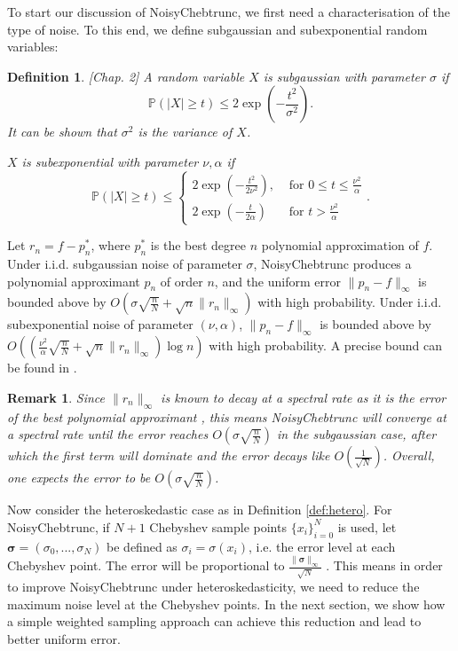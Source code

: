 \documentclass[pdflatex,sn-mathphys-num]{sn-jnl}%
\theoremstyle{thmstyleone}%
\theoremstyle{thmstyletwo}%
\newtheorem{remark}{Remark}%
\newtheorem{definition}{Definition}%
\theoremstyle{thmstylethree}%
\begin{document}
To start our discussion of NoisyChebtrunc, we first need a characterisation of the type of noise. To this end, we define subgaussian and subexponential random variables:

\begin{definition} \cite{Wainwright_2019}[Chap. 2]
	A random variable $X$ is subgaussian with parameter $\sigma$ if 
	\[\mathbb{P}( |X|\geq t) \leq 2\exp(-\frac{t^2}{\sigma^2}).\]
	It can be shown that $\sigma^2$ is the variance of $X$.
	
	
	$X$ is subexponential with parameter $\nu, \alpha$ if
	\begin{equation*}
		\mathbb{P}( |X|\geq t) \leq 
		\begin{cases}
			2\exp(-\frac{t^2}{2\nu^2}), &\text{ for } 0\leq t \leq \frac{\nu^2}{\alpha}\\
			2\exp(-\frac{t}{2\alpha}) &\text{ for } t>\frac{\nu^2}{\alpha}
			
		\end{cases}.
	\end{equation*} 
\end{definition}

Let $r_n = f-p_n^*$, where $p_n^*$ is the best degree $n$ polynomial approximation of $f$. Under i.i.d. subgaussian noise of parameter $\sigma$, NoisyChebtrunc produces a polynomial approximant $p_n$ of order $ n $, and the uniform error $\|p_n-f\|_\infty$ is bounded above by $O(\sigma\sqrt{\frac{n}{N}} + \sqrt{n}\|r_n\|_\infty )$ with high probability. Under i.i.d. subexponential noise of parameter $(\nu, \alpha)$, $\|p_n-f\|_\infty$ is bounded above by $O\left( (\frac{\nu^2}{\alpha}\sqrt{\frac{n}{N}}+\sqrt{n}\|r_n\|_\infty)\log n\right)$ with high probability. A precise bound can be found in \cite{yuji}.


\begin{remark}
	Since $\|r_n\|_\infty$ is known to decay at a spectral rate as it is the error of the best polynomial approximant \cite{ATAP}, this means NoisyChebtrunc will converge at a spectral rate until the error reaches $O(\sigma \sqrt{\frac{n}{N}})$ in the subgaussian case, after which the first term will dominate and the error decays like $O(\frac{1}{\sqrt{N}})$. Overall, one expects the error to be $O(\sigma\sqrt{\frac{n}{N}})$.
\end{remark}

Now consider the heteroskedastic case as in Definition \ref{def:hetero}. For NoisyChebtrunc, if $N+1$ Chebyshev sample points $\{x_i\}_{i=0}^N$ is used, let $ \bm{\sigma} = (\sigma_0, ..., \sigma_N)$ be defined as $\sigma_i = \sigma(x_i)$, i.e. the error level at each Chebyshev point. The error will be proportional to $\frac{\|\bm{\sigma} \| _\infty}{\sqrt{N}}$ \cite{yuji}. This means in order to improve NoisyChebtrunc under heteroskedasticity, we need to reduce the maximum noise level at the Chebyshev points. In the next section, we show how a simple weighted sampling approach can achieve this reduction and lead to better uniform error.
\end{document}
